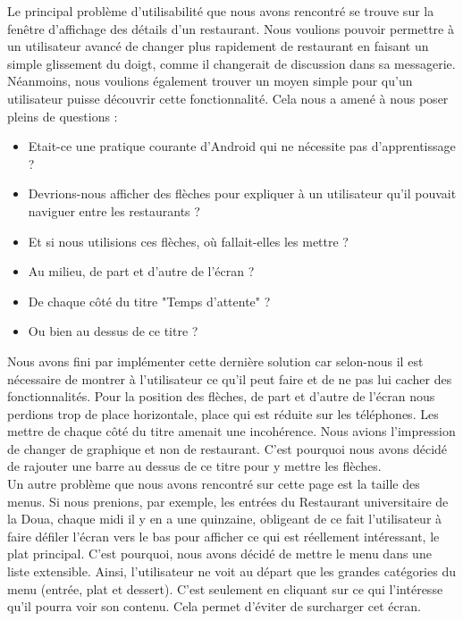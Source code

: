 Le principal problème d'utilisabilité que nous avons rencontré se trouve sur 
la fenêtre d'affichage des détails d'un restaurant. Nous voulions pouvoir 
permettre à un utilisateur avancé de changer plus rapidement de restaurant
en faisant un simple glissement du doigt, comme il changerait de discussion dans sa
messagerie. Néanmoins, nous voulions également trouver un moyen simple pour
qu'un utilisateur puisse découvrir cette fonctionnalité. Cela nous a amené 
à nous poser pleins de questions :  

\begin{itemize}
\item Etait-ce une pratique courante d'Android qui ne nécessite pas d'apprentissage ?
\item Devrions-nous afficher des flèches pour expliquer à un utilisateur qu'il pouvait
naviguer entre les restaurants ? 
\item Et si nous utilisions ces flèches, où fallait-elles les mettre ?
\item Au milieu, de part et d'autre de l'écran ?
\item De chaque côté du titre "Temps d'attente" ?
\item Ou bien au dessus de ce titre ? 
\end{itemize}

Nous avons fini par implémenter cette dernière solution car selon-nous il est nécessaire
de montrer à l'utilisateur ce qu'il peut faire et de ne pas lui cacher des fonctionnalités.
Pour la position des flèches, de part et d'autre de l'écran nous perdions trop de place horizontale, 
place qui est réduite sur les téléphones. Les mettre de chaque côté du titre amenait une
incohérence. Nous avions l'impression de changer de graphique et non de restaurant. C'est
pourquoi nous avons décidé de rajouter une barre au dessus de ce titre pour y mettre les
flèches. \\
 
Un autre problème que nous avons rencontré sur cette page est la taille des menus. Si 
nous prenions, par exemple, les entrées du Restaurant universitaire de la Doua, chaque midi
il y en a une quinzaine, obligeant de ce fait l'utilisateur
à faire défiler l'écran vers le bas pour afficher ce qui est réellement intéressant, le 
plat principal. C'est pourquoi, nous avons décidé de mettre le menu dans une liste extensible.
Ainsi, l'utilisateur ne voit au départ que les grandes catégories du menu (entrée, plat et
dessert). C'est seulement en cliquant sur ce qui l'intéresse qu'il pourra voir son contenu.
Cela permet d'éviter de surcharger cet écran. \\
 
